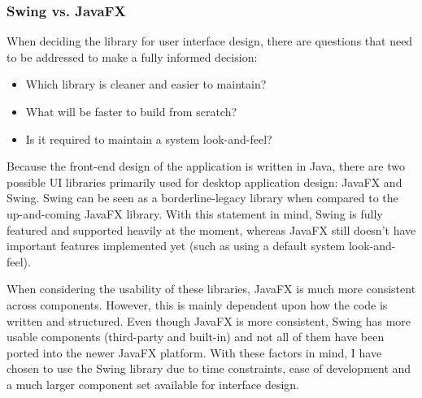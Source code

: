 \subsubsection{Swing vs. JavaFX}

When deciding the library for user interface design, there are questions that need to be addressed to make a fully informed decision:

\begin{itemize}
	\item{Which library is cleaner and easier to maintain?}
	\item{What will be faster to build from scratch?}
	\item{Is it required to maintain a system look-and-feel?}
\end{itemize}

Because the front-end design of the application is written in Java, there are two possible UI libraries primarily used for desktop application design: JavaFX and Swing. Swing can be seen as a borderline-legacy library when compared to the up-and-coming JavaFX library. With this statement in mind, Swing is fully featured and supported heavily at the moment, whereas JavaFX still doesn't have important features implemented yet (such as using a default system look-and-feel).

When considering the usability of these libraries, JavaFX is much more consistent across components. However, this is mainly dependent upon how the code is written and structured. Even though JavaFX is more consistent, Swing has more usable components (third-party and built-in) and not all of them have been ported into the newer JavaFX platform. With these factors in mind, I have chosen to use the Swing library due to time constraints, ease of development and a much larger component set available for interface design.
